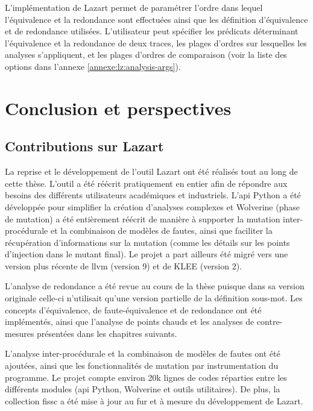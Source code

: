             L'implémentation de Lazart permet de paramétrer l'ordre dans lequel l'équivalence et la redondance sont effectuées ainsi que les définition d'équivalence et de redondance utilisées. 
            L'utilisateur peut spécifier les prédicats déterminant l'équivalence et la redondance de deux traces, les plages d'ordres sur lesquelles les analyses s'appliquent, et les plages d'ordres de comparaison (voir la liste des options dans l'annexe \ref{annexe:lz:analysis-args}).
            
    \section{Conclusion et perspectives}
    \label{sec:lazart-conclusion}
    
        \subsection{Contributions sur Lazart}
        
            La reprise et le développement de l'outil Lazart ont été réalisés tout au long de cette thèse. 
            L'outil a été réécrit pratiquement en entier afin de répondre aux besoins des différents utilisateurs académiques et industriels. L'\gls{api} Python a été développée pour simplifier la création d'analyses complexes et Wolverine (phase de mutation) a été entièrement réécrit de manière à supporter la mutation inter-procédurale et la combinaison de modèles de fautes, ainsi que faciliter la récupération d'informations sur la mutation (comme les détails sur les points d'injection dans le mutant final). Le projet a part ailleurs été migré vers une version plus récente de \gls{llvm} (version 9) et de KLEE (version 2). 
            
            L'analyse de redondance a été revue au cours de la thèse puisque dans sa version originale \cite{Potet/ICST14} celle-ci n'utilisait qu'une version partielle de la définition sous-mot. Les concepts d'équivalence, de faute-équivalence et de redondance ont été implémentés, ainsi que l'analyse de points chauds et les analyses de contre-mesures présentées dans les chapitres suivants.
            
            L'analyse inter-procédurale et la combinaison de modèles de fautes ont été ajoutées, ainsi que les fonctionnalités de mutation par instrumentation du programme.
            Le projet compte environ 20k lignes de codes réparties entre les différents modules (\gls{api} Python, Wolverine et outils utilitaires). 
            De plus, la collection \gls{fissc} a été mise à jour au fur et à mesure du développement de Lazart. 
        
